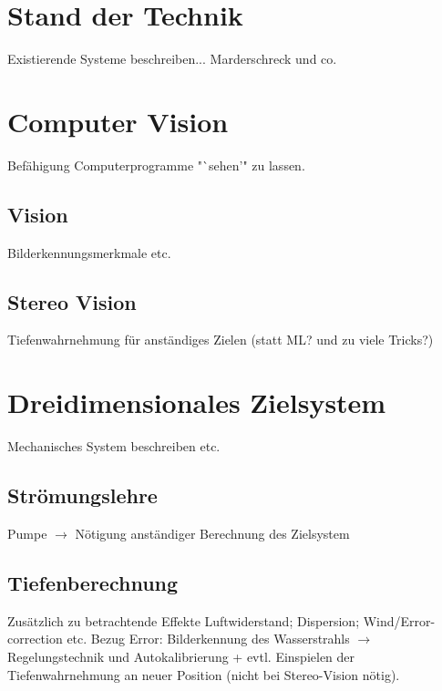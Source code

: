 
\section{Stand der Technik}

Existierende Systeme beschreiben... Marderschreck und co.

\section{Computer Vision}

Befähigung Computerprogramme "`sehen'" zu lassen.

\subsection{Vision}

Bilderkennungsmerkmale etc.

\subsection{Stereo Vision}

Tiefenwahrnehmung für anständiges Zielen (statt ML? und zu viele Tricks?)

\section{Dreidimensionales Zielsystem}

Mechanisches System beschreiben etc.

\subsection{Strömungslehre}

Pumpe $\rightarrow$ Nötigung anständiger Berechnung des Zielsystem

\subsection{Tiefenberechnung}

Zusätzlich zu betrachtende Effekte Luftwiderstand; Dispersion; Wind/Error-correction etc.
Bezug Error: Bilderkennung des Wasserstrahls $\rightarrow$ Regelungstechnik und Autokalibrierung
+ evtl. Einspielen der Tiefenwahrnehmung an neuer Position (nicht bei Stereo-Vision nötig).
